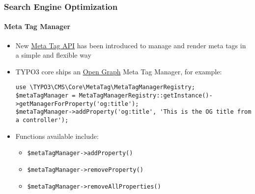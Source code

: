 \begin{frame}[fragile]
	\frametitle{Search Engine Optimization}
	\framesubtitle{Meta Tag Manager}

	\lstset{basicstyle=\tiny\ttfamily}

	\begin{itemize}
		\item New
			\href{https://docs.typo3.org/typo3cms/CoreApiReference/ApiOverview/MetaTagApi/Index.html}{Meta Tag API}
			has been introduced to manage and render meta tags in a simple and
			flexible way
		\item TYPO3 core ships an \href{http://ogp.me/}{Open Graph}
			Meta Tag Manager, for example:

\begin{lstlisting}
use \TYPO3\CMS\Core\MetaTag\MetaTagManagerRegistry;
$metaTagManager = MetaTagManagerRegistry::getInstance()->getManagerForProperty('og:title');
$metaTagManager->addProperty('og:title', 'This is the OG title from a controller');
\end{lstlisting}

		\item Functions available include:

			\begin{itemize}
				\smaller
					\item \texttt{\$metaTagManager->addProperty()}
					\item \texttt{\$metaTagManager->removeProperty()}
					\item \texttt{\$metaTagManager->removeAllProperties()}
			\end{itemize}

	\end{itemize}

\end{frame}


